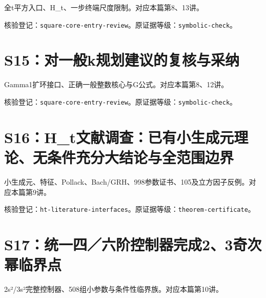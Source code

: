 \documentclass[11pt,a4paper,oneside,openany]{book}
\theoremstyle{definition}\newtheorem{example}[theorem]{例}\newtheorem{conjecture}[theorem]{猜想}
\numberwithin{equation}{chapter}\setcounter{tocdepth}{1}
\begin{document}
全t平方入口、H\_t、一步终端尺度限制。对应本篇第8、13讲。

\par{}\par

核验登记：{\small\nolinkurl{square-core-entry-review}}。原证据等级：{\small\nolinkurl{symbolic-check}}。

\section{S15：对一般k规划建议的复核与采纳}\label{source:S15}

Gamma1扩环接口、正确一般整数核心与G公式。对应本篇第8、12讲。

\par{}\par

核验登记：{\small\nolinkurl{square-core-entry-review}}。原证据等级：{\small\nolinkurl{symbolic-check}}。

\section{S16：H\_t文献调查：已有小生成元理论、无条件充分大结论与全范围边界}\label{source:S16}

小生成元、特征、Pollack、Bach/GRH、998参数证书、105及立方因子反例。对应本篇第9讲。

\par{}\par

核验登记：{\small\nolinkurl{ht-literature-interfaces}}。原证据等级：{\small\nolinkurl{theorem-certificate}}。

\section{S17：统一四／六阶控制器完成2、3奇次幂临界点}\label{source:S17}

2s²/3s²完整控制器、508组小参数与条件性临界族。对应本篇第10讲。

\par{}\par
\end{document}
